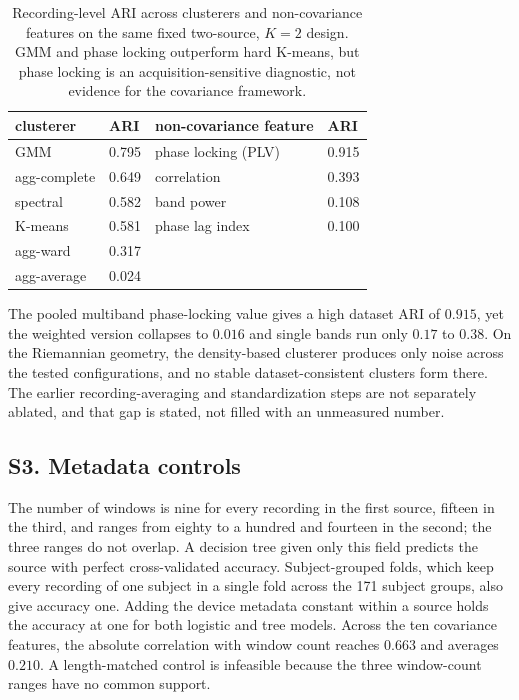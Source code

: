 \begin{table}[H]
\centering
\small
\caption{Recording-level ARI across clusterers and non-covariance features on the same fixed two-source, $K=2$ design. GMM and phase locking outperform hard K-means, but phase locking is an acquisition-sensitive diagnostic, not evidence for the covariance framework.}
\label{tab:clusterers}
\begin{tabular}{llll}
\hline
clusterer & ARI & non-covariance feature & ARI\\
\hline
GMM & 0.795 & phase locking (PLV) & 0.915\\
agg-complete & 0.649 & correlation & 0.393\\
spectral & 0.582 & band power & 0.108\\
K-means & 0.581 & phase lag index & 0.100\\
agg-ward & 0.317 & &\\
agg-average & 0.024 & &\\
\hline
\end{tabular}

\end{table}

The pooled multiband phase-locking value gives a high dataset ARI of
\(0.915\), yet the weighted version collapses to \(0.016\) and single
bands run only \(0.17\) to \(0.38\). On the Riemannian geometry, the
density-based clusterer produces only noise across the tested
configurations, and no stable dataset-consistent clusters form there.
The earlier recording-averaging and standardization steps are not
separately ablated, and that gap is stated, not filled with an
unmeasured number.

\subsection{S3. Metadata controls}\label{s3.-metadata-controls}

The number of windows is nine for every recording in the first source,
fifteen in the third, and ranges from eighty to a hundred and fourteen
in the second; the three ranges do not overlap. A decision tree given
only this field predicts the source with perfect cross-validated
accuracy. Subject-grouped folds, which keep every recording of one
subject in a single fold across the 171 subject groups, also give
accuracy one. Adding the device metadata constant within a source holds
the accuracy at one for both logistic and tree models. Across the ten
covariance features, the absolute correlation with window count reaches
\(0.663\) and averages \(0.210\). A length-matched control is infeasible
because the three window-count ranges have no common support.

